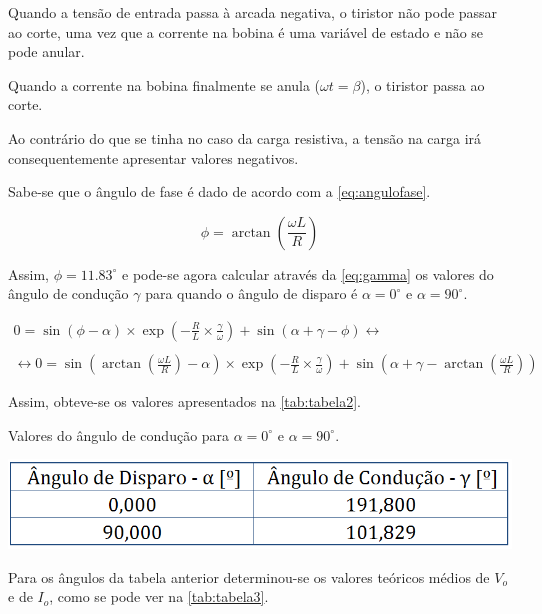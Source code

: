 \documentclass[a4paper,11pt]{article}
\numberwithin{equation}{section}
\begin{document}
Quando a tensão de entrada passa à arcada negativa, o tiristor não pode passar ao corte, uma vez que a corrente na bobina é uma variável de estado e não se pode anular.

Quando a corrente na bobina finalmente se anula ($\omega t = \beta$), o tiristor passa ao corte.

Ao contrário do que se tinha no caso da carga resistiva, a tensão na carga irá consequentemente apresentar valores negativos.

Sabe-se que o ângulo de fase é dado de acordo com a \autoref{eq:angulofase}.

\begin{equation}
\label{eq:angulofase}
\phi =  \arctan \left(\frac{\omega L}{R}\right)
\end{equation}

Assim, $\phi = 11.83^{\circ}$ e pode-se agora calcular através da \autoref{eq:gamma} os valores do ângulo de condução $\gamma$ para quando o ângulo de disparo é $\alpha = 0^{\circ}$ e $\alpha = 90^{\circ}$.

\begin{equation}
\begin{gathered}
0 = \sin \left( \phi - \alpha \right) \times \exp \left( - \frac{R}{L} \times \frac{\gamma}{\omega}\right) + \sin \left( \alpha + \gamma - \phi \right) \leftrightarrow \\ \\
\leftrightarrow 0 = \sin \left( \arctan \left(\frac{\omega L}{R} \right) - \alpha \right) \times \exp \left( - \frac{R}{L} \times \frac{\gamma}{\omega}\right) + \sin \left( \alpha + \gamma - \arctan \left(\frac{\omega L}{R}\right) \right)
\label{eq:gamma}
\end{gathered}
\end{equation}

Assim, obteve-se os valores apresentados na \autoref{tab:tabela2}.

\begin{table}[!htb]
	\centering
	\caption{Valores do ângulo de condução para $\alpha = 0^{\circ}$ e $\alpha = 90^{\circ}$.}
	\vspace{-3mm}
	\includegraphics[width=0.5\linewidth]{teoricas/tabela2}
	\label{tab:tabela2}
\end{table}

Para os ângulos da tabela anterior determinou-se os valores teóricos médios de $V_o$ e de $I_o$, como se pode ver na \autoref{tab:tabela3}.
\end{document}
